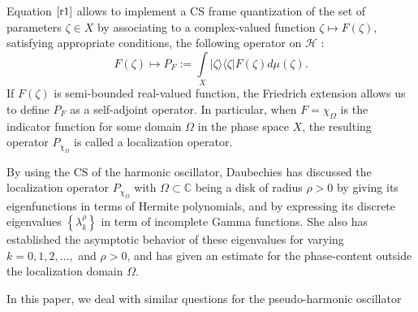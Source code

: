 \smallskip

Equation $\eqref{r1} $ allows to implement a CS frame quantization \cite{G} of the set of parameters $\zeta \in X$ by associating to a
complex-valued function $\zeta \mapsto F(\zeta )$, satisfying appropriate
conditions, the following operator on $\mathcal{H}$ : 
\begin{equation}
\label{r2}
F(\zeta )\mapsto P_{F}:=\int\limits_{X}|\zeta \rangle \langle \zeta |F(\zeta
)d\mu (\zeta ).  
\end{equation}
If $F(\zeta )$ is semi-bounded real-valued function, the Friedrich extension 
\cite{RS} allows us to define $P_{F}$ as a self-adjoint operator.
In particular, when $F=\chi _{\Omega }$ is the indicator function for some
domain $\Omega $ in the phase space $X$, the resulting operator $P_{\chi
_{\Omega }}$ is called a localization operator.

\smallskip \smallskip

By using the CS of the harmonic oscillator, Daubechies \cite{Daub}
has discussed the localization operator $P_{\chi _{\Omega }}$ with $\Omega
\subset \mathbb{C}$ being a disk of radius $\rho >0$ by giving its
eigenfunctions in terms of Hermite polynomials, and by expressing its
discrete eigenvalues $\left\{ \lambda _{k}^{\rho }\right\} $ in term of
incomplete Gamma functions. She also has established the asymptotic behavior
of these eigenvalues for varying $k=0,1,2,...,$ and $\rho >0$, and has given
an estimate for the phase-content outside the localization domain $\Omega $.

\smallskip

In this paper, we deal with similar questions for the pseudo-harmonic
oscillator 

